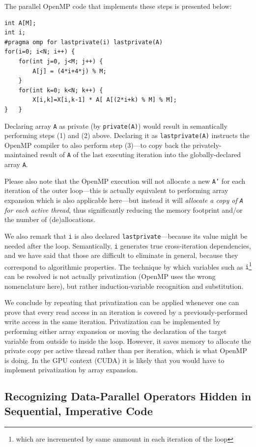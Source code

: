 \documentclass[acmsmall,review]{acmart}\settopmatter{printfolios=true,printccs=false,printacmref=false}
\begin{document}
The parallel OpenMP code that implements these steps is 
presented below:
\begin{lstlisting}[mathescape=true]
int A[M];
int i;
#pragma omp for lastprivate(i) lastprivate(A) 
for(i=0; i<N; i++) {
    for(int j=0, j<M; j++) {
        A[j] = (4*i+4*j) % M;
    }
    for(int k=0; k<N; k++) {
        X[i,k]=X[i,k-1] * A[ A[(2*i+k) % M] % M];
}   }
\end{lstlisting}\vspace{-2ex}
Declaring array {\tt A} as private (by {\tt private(A)}) would 
result in semantically performing steps (1) 
and (2) above. Declaring it as {\tt lastprivate(A)} instructs 
the OpenMP compiler to also perform step (3)---to copy back 
the privately-maintained result of {\tt A} of the last executing 
iteration into the globally-declared array {\tt A}.

Please also note that the OpenMP execution will not allocate
a new {\tt A'} for each iteration of the outer loop---this is 
actually equivalent to performing array expansion which is also
applicable here---but instead it will {\em allocate a copy of 
{\tt A} for each active thread}, thus significantly reducing 
the memory footprint and/or the number of (de)allocations.
 
We also remark that {\tt i} is also declared
{\tt lastprivate}---because its value might be needed after
the loop. Semantically, {\tt i} generates true cross-iteration
dependencies, and we have said that those are difficult to eliminate
in general, because they correspond to algorithmic properties.
The technique by which variables such as {\tt i}\footnote{which are
incremented by same ammount in each iteration of the loop} can 
be resolved is not actually privatization (OpenMP uses the wrong 
nomenclature here), but rather induction-variable recognition and 
substitution.

We conclude by repeating that privatization can be applied whenever
one can prove that every read access in an iteration is covered by 
a previously-performed write access in the same iteration. 
Privatization can be implemented by performing either array 
expansion or moving the declaration of the target variable from
outside to inside the loop. However, it saves memory to allocate
the private copy per active thread rather than per iteration,
which is what OpenMP is doing. In the GPU context (CUDA) it is
likely that you would have to implement privatization by 
array expansion.

\subsection{Recognizing Data-Parallel Operators Hidden in Sequential, Imperative Code}
\label{subsec:soacs-in-imp-code}
\end{document}
